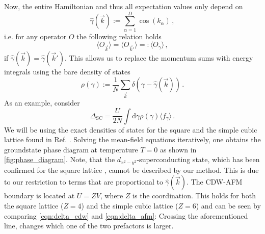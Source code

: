 \documentclass[
    reprint, 
    aps,
    preprintnumbers,
    twocolumn,
    prb,
    superscriptaddress
]{revtex4-2}
\newcommand{\vk}{\vec{k}}
\newcommand{\dgamma}{\mathrm{d}\gamma}
\begin{document}
Now, the entire Hamiltonian and thus all expectation values only depend on
\begin{equation}
    \hat{\gamma}(\vk) := \sum_{\alpha=1}^D \cos(k_\alpha)\,,
\end{equation}
i.e. for any operator $O$ the following relation holds 
\begin{equation}
    \label{eqn:equal_expecs}
    \langle O_{\vk} \rangle = \langle O_{\vk'} \rangle =: \langle O_{\gamma} \rangle\,,
\end{equation}
if $\hat{\gamma}(\vk) = \hat{\gamma}(\vk')$.
This allows us to replace the momentum sums with energy integrals using the bare density of states
\begin{equation}
    \rho(\gamma) := \frac{1}{N} \sum_{\vk} \delta \left(\gamma - \hat{\gamma} (\vk) \right)\,.
\end{equation}
As an example, consider 
\begin{equation}
    \Delta_\text{SC} = \frac{U}{2N} \int \dgamma \rho(\gamma) \langle f_{\gamma} \rangle\,.
\end{equation}
We will be using the exact densities of states for the square and the simple cubic lattice found in Ref. \cite{Hanisch97}.
Solving the mean-field equations iteratively, one obtains the groundstate phase diagram at temperature $T=0$ as shown in \autoref{fig:phase_diagram}.
Note, that the $d_{x^2 - y^2}$-superconducting state, which has been confirmed for the square lattice \cite{Micnas88b,Huang13}, cannot be described by our method. 
This is due to our restriction to terms that are proportional to $\hat{\gamma}(\vk)$.
\newline
The CDW-AFM boundary is located at $U = ZV$, where $Z$ is the coordination.
This holds for both the square lattice ($Z=4$) and the simple cubic lattice ($Z=6$) and can be seen by comparing \eqref{eqn:delta_cdw} and \eqref{eqn:delta_afm}:
Crossing the aforementioned line, changes which one of the two prefactors is larger.


\end{document}
